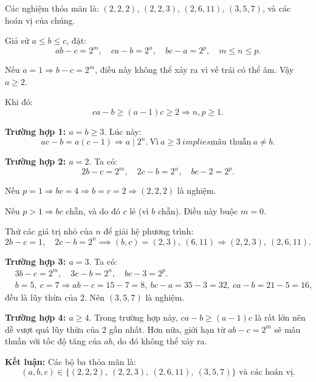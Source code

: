 \documentclass[../06-largest-exponent.tex]{subfiles}
\begin{document}
\begin{soln}\footnotemark
	Các nghiệm thỏa mãn là: \( (2,2,2) \), \( (2,2,3) \), \( (2,6,11) \), \( (3,5,7) \), và các hoán vị của chúng.

	Giả sử \( a \le b \le c \), đặt:
	\[
		ab - c = 2^m,\quad ca - b = 2^n,\quad bc - a = 2^p,\quad m \le n \le p.
	\]

	Nếu \( a = 1 \Rightarrow b - c = 2^m \), điều này không thể xảy ra vì vế trái có thể âm. Vậy \( a \ge 2 \).

	Khi đó:
	\[
		ca - b \ge (a - 1)c \ge 2 \Rightarrow n, p \ge 1.
	\]

	\textbf{Trường hợp 1: \( a = b \ge 3 \)}.
	Lúc này:
	\[
		ac - b = a(c - 1) \Rightarrow a \mid 2^n.\ \text{Vì}\ a \ge 3\ implies \text{mâu thuẫn}\ a \ne b.
	\]

	\textbf{Trường hợp 2: \( a = 2 \)}.
	Ta có:
	\[
		2b - c = 2^m,\quad 2c - b = 2^n,\quad bc - 2 = 2^p.
	\]

	Nếu \( p = 1 \Rightarrow bc = 4 \Rightarrow b = c = 2 \Rightarrow (2,2,2) \) là nghiệm.

	Nếu \( p > 1 \Rightarrow bc \) chẵn, và do đó \( c \) lẻ (vì \( b \) chẵn). Điều này buộc \( m = 0 \).

	Thử các giá trị nhỏ của \( n \) để giải hệ phương trình:
	\[
		2b - c = 1,\quad 2c - b = 2^n \implies (b,c) = (2,3),\ (6,11) \Rightarrow (2,2,3),\ (2,6,11).
	\]

	\textbf{Trường hợp 3: \( a = 3 \)}.
	Ta có:
	\[
		\begin{aligned}
			&3b - c = 2^m,\quad 3c - b = 2^n,\quad bc - 3 = 2^p.\\
			&b = 5,\ c = 7 \Rightarrow ab - c = 15 - 7 = 8,\ bc - a = 35 - 3 = 32,\ ca - b = 21 - 5 = 16,
		\end{aligned}
	\]
	đều là lũy thừa của 2. Nên \( (3,5,7) \) là nghiệm.

	\textbf{Trường hợp 4: \( a \ge 4 \)}.
	Trong trường hợp này, \( ca - b \ge (a - 1)c \) là rất lớn nên dễ vượt quá lũy thừa của 2 gần nhất.  
	Hơn nữa, giới hạn từ \( ab - c = 2^m \) sẽ mâu thuẫn với tốc độ tăng của \( ab \), do đó không thể xảy ra.

	\textbf{Kết luận:} Các bộ ba thỏa mãn là:
	\[
		\boxed{(a, b, c) \in \{ (2,2,2),\ (2,2,3),\ (2,6,11),\ (3,5,7) \} \text{ và các hoán vị.}}
	\]
\end{soln}

\end{document}

